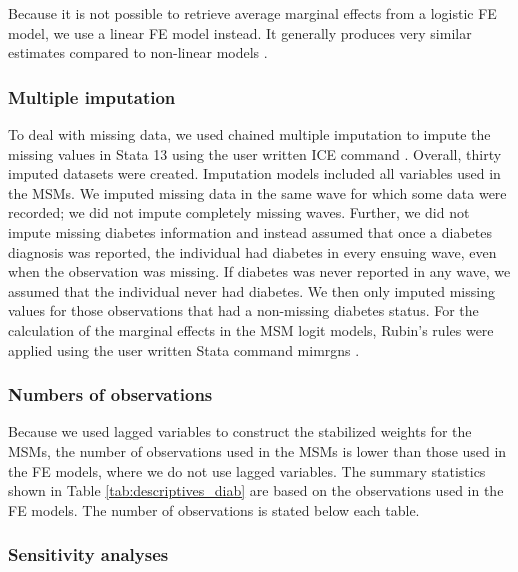 Because it is not possible to retrieve average marginal effects from a logistic \ac{FE} model, we use a linear \ac{FE} model instead. It generally produces very similar estimates compared to non-linear models \parencite{Angrist2009a}.

\subsubsection*{Multiple imputation}

To deal with missing data, we used chained multiple imputation to impute the missing values in Stata 13 using the user written ICE command \parencite{Royston2009}. Overall, thirty imputed datasets were created. Imputation models included all variables used in the \acp{MSM}. We imputed missing data in the same wave for which some data were recorded; we did not impute completely missing waves. Further, we did not impute missing diabetes information and instead assumed that once a diabetes diagnosis was reported, the individual had diabetes in every ensuing wave, even when the observation was missing. If diabetes was never reported in any wave, we assumed that the individual never had diabetes. We then only imputed missing values for those observations that had a non-missing diabetes status. For the calculation of the marginal effects in the \ac{MSM} logit models, Rubin's rules were applied using the user written Stata command mimrgns \parencite{Klein2014}.

\subsubsection*{Numbers of observations}

Because we used lagged variables to construct the stabilized weights for the \acp{MSM}, the number of observations used in the \acp{MSM} is lower than those used in the \ac{FE} models, where we do not use lagged variables. The summary statistics shown in Table \ref{tab:descriptives_diab} are based on the observations used in the \ac{FE} models. The number of observations is stated below each table.

\subsubsection*{Sensitivity analyses}

